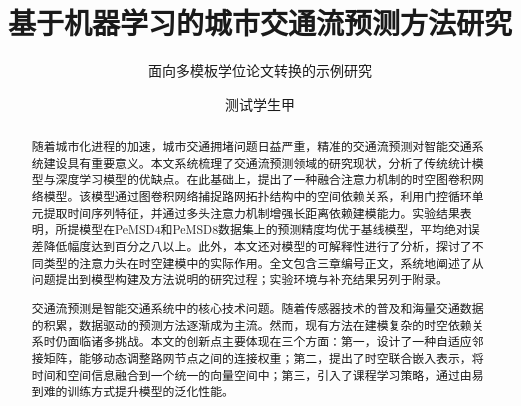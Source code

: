 \documentclass[12pt,a4paper,twoside]{ctexbook}
\title{基于机器学习的城市交通流预测方法研究}
\subtitle{面向多模板学位论文转换的示例研究}
\author{测试学生甲}
\begin{document}
\begin{abstract}
随着城市化进程的加速，城市交通拥堵问题日益严重，精准的交通流预测对智能交通系统建设具有重要意义。本文系统梳理了交通流预测领域的研究现状，分析了传统统计模型与深度学习模型的优缺点。在此基础上，提出了一种融合注意力机制的时空图卷积网络模型。该模型通过图卷积网络捕捉路网拓扑结构中的空间依赖关系，利用门控循环单元提取时间序列特征，并通过多头注意力机制增强长距离依赖建模能力。实验结果表明，所提模型在PeMSD4和PeMSD8数据集上的预测精度均优于基线模型，平均绝对误差降低幅度达到百分之八以上。此外，本文还对模型的可解释性进行了分析，探讨了不同类型的注意力头在时空建模中的实际作用。全文包含三章编号正文，系统地阐述了从问题提出到模型构建及方法说明的研究过程；实验环境与补充结果另列于附录。

交通流预测是智能交通系统中的核心技术问题。随着传感器技术的普及和海量交通数据的积累，数据驱动的预测方法逐渐成为主流。然而，现有方法在建模复杂的时空依赖关系时仍面临诸多挑战。本文的创新点主要体现在三个方面：第一，设计了一种自适应邻接矩阵，能够动态调整路网节点之间的连接权重；第二，提出了时空联合嵌入表示，将时间和空间信息融合到一个统一的向量空间中；第三，引入了课程学习策略，通过由易到难的训练方式提升模型的泛化性能。
\end{abstract}

\end{document}

